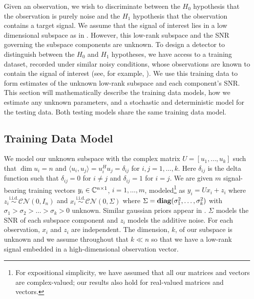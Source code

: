 Given an observation, we wish to discriminate between the $H_0$ hypothesis that the observation is purely noise and the $H_1$ hypothesis that the observation contains a target signal. We assume that the signal of interest lies in a low dimensional subspace as in \cite{besson2005matched,besson2006cfar,bandiera2007adaptive,bandiera2007glrt,maris2003resampling,soong1995principal,thai2002invariant, healey1999models,kwon2006kernel}. However, this low-rank subspace and the SNR governing the subspace components are unknown. To design a detector to distinguish between the $H_0$ and $H_1$ hypotheses, we have access to a training dataset, recorded under similar noisy conditions, whose observations are known to contain the signal of interest (see, for example, \cite{healey1999models,kwon2006kernel}). We use this training data to form estimates of the unknown low-rank subspace and each component's SNR. This section will mathematically describe the training data models, how we estimate any unknown parameters, and a stochastic and deterministic model for the testing data. Both testing models share the same training data model.

\subsection{Training Data Model}\label{sec:training_data}

We model our unknown subspace with the complex matrix $U=[u_1,\dots,u_k]$ such that $\dim u_i = n$ and $\langle u_i, u_j\rangle = u_i^Hu_j=\delta_{ij}$ for $i,j=1,\dots,k$. Here $\delta_{ij}$ is the delta function such that $\delta_{ij} = 0$ for $i\neq j$ and $\delta_{ij}=1$ for $i=j$. We are given $m$ signal-bearing training vectors $y_i\in \mathbb{C}^{n\times 1}$, $i=1,\dots,m$, modeled\footnote{For expositional simplicity, we have assumed that all our matrices and vectors are complex-valued; our results also hold for real-valued matrices and vectors.} as $y_i=Ux_i+z_i$ where $z_i\overset{\text{i.i.d.}}{\sim}\mathcal{CN}(0,I_n)$ and $x_i\overset{\text{i.i.d.}}{\sim}\mathcal{CN}(0,\Sigma)$ where $\Sigma=\mathop{\bf diag}(\sigma_1^2,\dots,\sigma_k^2)$ with $\sigma_1>\sigma_2>\dots>\sigma_k>0$ unknown. Similar gaussian priors appear in \cite{bandiera2007adaptive,bandiera2007glrt,thai2002invariant, healey1999models}. $\Sigma$ models the SNR of each subspace component and $z_i$ models the additive noise. For each observation, $x_i$ and $z_i$ are independent. The dimension, $k$, of our subspace is unknown and we assume throughout that $k\ll n$ so that we have a low-rank signal embedded in a high-dimensional observation vector.

